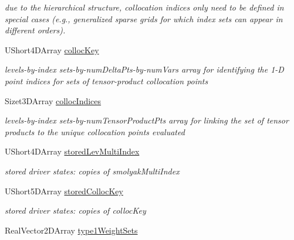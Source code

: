 \begin{DoxyCompactItemize}
\begin{DoxyCompactList}\small\item\em due to the hierarchical structure, collocation indices only need to be defined in special cases (e.\+g., generalized sparse grids for which index sets can appear in different orders). \end{DoxyCompactList}\item 
U\+Short4\+D\+Array \hyperlink{classPecos_1_1HierarchSparseGridDriver_a7cbbd68b6b4e7320cb28a5e4b8894f52}{colloc\+Key}\label{classPecos_1_1HierarchSparseGridDriver_a7cbbd68b6b4e7320cb28a5e4b8894f52}

\begin{DoxyCompactList}\small\item\em levels-\/by-\/index sets-\/by-\/num\+Delta\+Pts-\/by-\/num\+Vars array for identifying the 1-\/D point indices for sets of tensor-\/product collocation points \end{DoxyCompactList}\item 
Sizet3\+D\+Array \hyperlink{classPecos_1_1HierarchSparseGridDriver_a9d5321a039a785dbc50d99212c18325c}{colloc\+Indices}\label{classPecos_1_1HierarchSparseGridDriver_a9d5321a039a785dbc50d99212c18325c}

\begin{DoxyCompactList}\small\item\em levels-\/by-\/index sets-\/by-\/num\+Tensor\+Product\+Pts array for linking the set of tensor products to the unique collocation points evaluated \end{DoxyCompactList}\item 
U\+Short4\+D\+Array \hyperlink{classPecos_1_1HierarchSparseGridDriver_a1bd8eb5cffea6b67f167ed179b36157e}{stored\+Lev\+Multi\+Index}\label{classPecos_1_1HierarchSparseGridDriver_a1bd8eb5cffea6b67f167ed179b36157e}

\begin{DoxyCompactList}\small\item\em stored driver states\+: copies of smolyak\+Multi\+Index \end{DoxyCompactList}\item 
U\+Short5\+D\+Array \hyperlink{classPecos_1_1HierarchSparseGridDriver_a686a8fd6e3090a7667c95d0a8d6c84da}{stored\+Colloc\+Key}\label{classPecos_1_1HierarchSparseGridDriver_a686a8fd6e3090a7667c95d0a8d6c84da}

\begin{DoxyCompactList}\small\item\em stored driver states\+: copies of colloc\+Key \end{DoxyCompactList}\item 
Real\+Vector2\+D\+Array \hyperlink{classPecos_1_1HierarchSparseGridDriver_a5de56b20e57fb8bb96f62e06de1e9ea3}{type1\+Weight\+Sets}\label{classPecos_1_1HierarchSparseGridDriver_a5de56b20e57fb8bb96f62e06de1e9ea3}


\end{DoxyCompactItemize}

